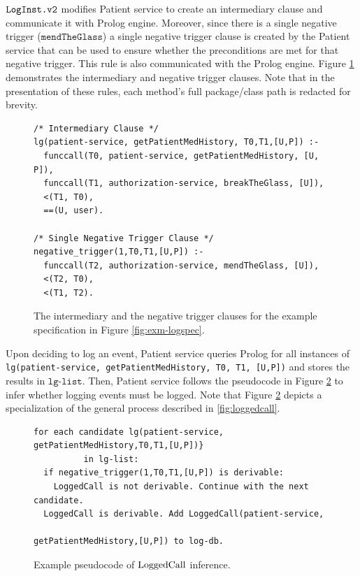 $\texttt{LogInst.v2}$ modifies Patient service to create an intermediary clause and communicate it with Prolog engine. Moreover, since there is a single negative trigger ($\texttt{mendTheGlass}$) a single negative trigger clause is created by the Patient service that can be used to ensure whether the preconditions are met for that negative trigger. This rule is also communicated with the Prolog engine.  Figure \ref{fig:exm-intermediary} demonstrates the intermediary and negative trigger clauses. Note that in the presentation of these rules, each method's full package/class path is redacted for brevity. 

\begin{figure}
\begin{tiny}
\begin{Verbatim}[frame=single]
/* Intermediary Clause */
lg(patient-service, getPatientMedHistory, T0,T1,[U,P]) :- 
  funccall(T0, patient-service, getPatientMedHistory, [U, P]),
  funccall(T1, authorization-service, breakTheGlass, [U]),
  <(T1, T0),
  ==(U, user).

/* Single Negative Trigger Clause */ 
negative_trigger(1,T0,T1,[U,P]) :-
  funccall(T2, authorization-service, mendTheGlass, [U]),
  <(T2, T0),
  <(T1, T2).
\end{Verbatim}
\end{tiny}
\caption{The intermediary and the negative trigger clauses for the example specification in Figure \ref{fig:exm-logspec}.}
\label{fig:exm-intermediary}
\end{figure}

Upon deciding to log an event, Patient service queries Prolog for all instances of \texttt{lg(patient-service, getPatientMedHistory, T0, T1, [U,P])} and stores the results in $\texttt{lg-list}$. Then, Patient service follows the pseudocode in Figure \ref{fig:exm-loggedcall} to infer whether logging events must be logged. Note that Figure \ref{fig:exm-loggedcall} depicts a specialization of the general process described in  \ref{fig:loggedcall}.

\begin{figure}
\begin{tiny}
\begin{Verbatim}[frame=single]
for each candidate lg(patient-service, getPatientMedHistory,T0,T1,[U,P])} 
          in lg-list:
  if negative_trigger(1,T0,T1,[U,P]) is derivable:
    LoggedCall is not derivable. Continue with the next candidate. 
  LoggedCall is derivable. Add LoggedCall(patient-service, 
                                          getPatientMedHistory,[U,P]) to log-db.
\end{Verbatim}
\end{tiny}
\caption{Example pseudocode of $\mathrm{LoggedCall}$ inference.}
\label{fig:exm-loggedcall}
\end{figure}





